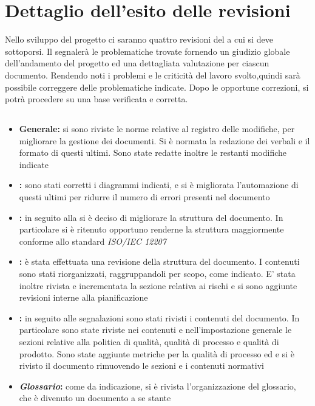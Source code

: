 \documentclass[12pt,a4paper]{article}
\begin{document}
	\newpage
	\section{Dettaglio dell'esito delle revisioni}
	Nello sviluppo del progetto ci saranno quattro revisioni del  a cui si deve sottoporsi. Il  segnalerà le problematiche trovate fornendo un giudizio globale dell'andamento del progetto ed una dettagliata valutazione per ciascun documento. Rendendo noti i problemi e le criticità del lavoro svolto,quindi sarà possibile correggere delle problematiche indicate. Dopo le opportune correzioni, si potrà procedere su una base verificata e corretta.
	
	\subsection{\RR{}}
	\begin{itemize}
		\item \textbf{Generale:} si sono riviste le norme relative al registro delle modifiche, per migliorare la gestione dei documenti. Si è normata la redazione dei verbali e il formato di questi ultimi. Sono state redatte inoltre le restanti modifiche indicate
		\item \textbf{\AdR{}:} sono stati corretti i diagrammi indicati, e si è migliorata l'automazione di questi ultimi per ridurre il numero di errori presenti nel documento
		\item \textbf{\NdP{}:} in seguito alla \RR{} si è deciso di migliorare la struttura del documento. In particolare si è ritenuto opportuno renderne la struttura maggiormente conforme allo standard \textit{ISO/IEC 12207}
		\item \textbf{\PdP{}:} è stata effettuata una revisione della struttura del documento. I contenuti sono stati riorganizzati, raggruppandoli per scopo, come indicato. E' stata inoltre rivista e incrementata la sezione relativa ai rischi e si sono aggiunte revisioni interne alla pianificazione
		\item \textbf{\PdQ{}:} in seguito alle segnalazioni sono stati rivisti i contenuti del documento. In particolare sono state riviste nei contenuti e nell'impostazione generale le sezioni relative alla politica di qualità, qualità di processo e qualità di prodotto. Sono state aggiunte metriche per la qualità di processo ed e si è rivisto il documento rimuovendo le sezioni e i contenuti normativi
		\item \textbf{\textit{Glossario}:} come da indicazione, si è rivista l'organizzazione del glossario, che è divenuto un documento a se stante
	\end{itemize}
	
\end{document}
